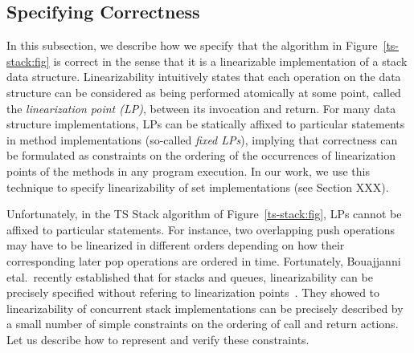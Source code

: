 \subsection{Specifying Correctness}
In this subsection, we describe how we specify that the algorithm in Figure~\ref{ts-stack:fig}
is correct in the sense that it is a linearizable implementation of a
stack data structure. Linearizability intuitively states that
each operation on the data structure can be considered as being
performed atomically at some point, called the {\em linearization point (LP)},
between its invocation and return.
For many data structure implementations, LPs can be statically
affixed to particular statements in method implementations (so-called
{\em fixed LPs}),
implying that correctness can be formulated as constraints on the ordering of the
occurrences of linearization points of the methods in any program
execution.
In our work, we use this technique to specify linearizability of
set implementations (see Section XXX).

Unfortunately, in the TS Stack algorithm of Figure~\ref{ts-stack:fig},
LPs cannot be affixed to particular statements. For instance,  two overlapping
push operations may have to be linearized in different orders depending
on how their corresponding later pop operations are ordered in time.
Fortunately, Bouajjanni etal.\ recently established that for stacks and
queues, linearizability can be precisely specified without refering to
linearization points~\cite{BEEH:icalp15}. They showed to linearizability
of concurrent stack implementations can be precisely described by
a small number of simple 
constraints on the ordering of call and return actions.
Let us describe how to represent and verify these constraints.

